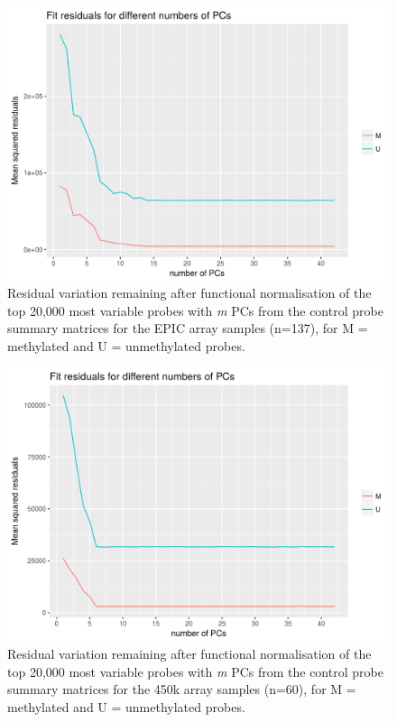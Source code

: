 \documentclass[
]{book}
\begin{document}
\begin{figure}

{\centering \includegraphics[width=0.8\linewidth]{figs/MAVIDOSfunnormPCsEPICMonApr162018} 

}

\caption{Residual variation remaining after functional normalisation of the top 20,000 most variable probes with \emph{m} PCs from the control probe summary matrices for the EPIC array samples (n=137), for M = methylated and U = unmethylated probes.}\label{fig:MAVIDOSfunnormPCsEPICMonApr162018}
\end{figure}



\begin{figure}

{\centering \includegraphics[width=0.8\linewidth]{figs/MAVIDOSfunnormPCs450kMonApr162018} 

}

\caption{Residual variation remaining after functional normalisation of the top 20,000 most variable probes with \emph{m} PCs from the control probe summary matrices for the 450k array samples (n=60), for M = methylated and U = unmethylated probes.}\label{fig:MAVIDOSfunnormPCs450kMonApr162018}
\end{figure}
\end{document}
